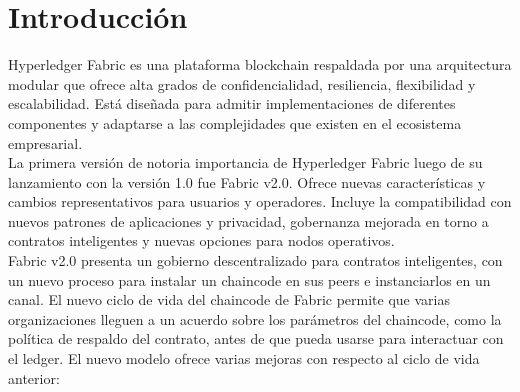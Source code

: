 \chapter*{Introducción}\label{chapter:introduction}

Hyperledger Fabric es una plataforma blockchain respaldada por una arquitectura modular que ofrece alta grados de confidencialidad, resiliencia, flexibilidad y escalabilidad. Est\'a dise\~nada para admitir implementaciones de diferentes componentes y adaptarse a las complejidades que existen en el ecosistema empresarial.\\

La primera versi\'on de notoria importancia de Hyperledger Fabric luego de su lanzamiento con la versi\'on 1.0 fue Fabric v2.0. Ofrece nuevas caracter\'isticas y cambios representativos para usuarios y operadores. Incluye la compatibilidad con nuevos patrones de aplicaciones y privacidad, gobernanza mejorada en torno a contratos inteligentes y nuevas opciones para nodos operativos.\\

Fabric v2.0 presenta un gobierno descentralizado para contratos inteligentes, con un nuevo proceso para instalar un chaincode en sus peers e instanciarlos en un canal. El nuevo ciclo de vida del chaincode de Fabric permite que varias organizaciones lleguen a un acuerdo sobre los par\'ametros del chaincode, como la pol\'itica de respaldo del contrato, antes de que pueda usarse para interactuar con el ledger. El nuevo modelo ofrece varias mejoras con respecto al ciclo de vida anterior:

